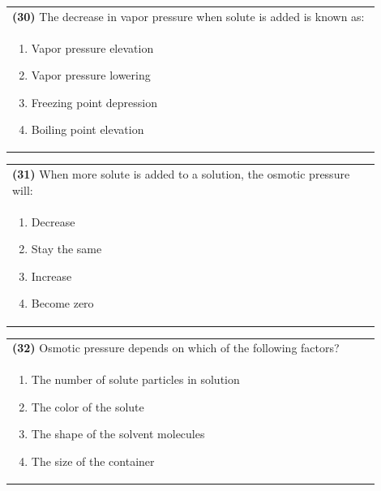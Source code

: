 \documentclass{article}
\begin{document}
\noindent\begin{tabular}{|p{0.9\linewidth}|}
\hline
\textbf{(30)} The decrease in vapor pressure when solute is added is known as:\\[0.2cm]
\begin{minipage}[t]{0.85\linewidth}
\begin{enumerate}[label=\alph*.]
\item Vapor pressure elevation
\item Vapor pressure lowering
\item Freezing point depression
\item Boiling point elevation
\end{enumerate}
\end{minipage}\\[0.2cm]
\hline
\end{tabular}

\noindent\begin{tabular}{|p{0.9\linewidth}|}
\hline
\textbf{(31)} When more solute is added to a solution, the osmotic pressure will:\\[0.2cm]
\begin{minipage}[t]{0.85\linewidth}
\begin{enumerate}[label=\alph*.]
\item Decrease
\item Stay the same
\item Increase
\item Become zero
\end{enumerate}
\end{minipage}\\[0.2cm]
\hline
\end{tabular}

\noindent\begin{tabular}{|p{0.9\linewidth}|}
\hline
\textbf{(32)} Osmotic pressure depends on which of the following factors?\\[0.2cm]
\begin{minipage}[t]{0.85\linewidth}
\begin{enumerate}[label=\alph*.]
\item The number of solute particles in solution
\item The color of the solute
\item The shape of the solvent molecules
\item The size of the container
\end{enumerate}
\end{minipage}\\[0.2cm]
\hline
\end{tabular}
\newpage
\end{document}
